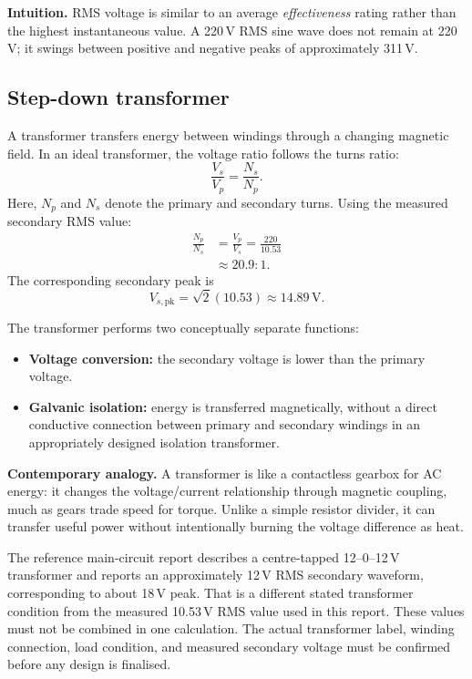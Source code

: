 \documentclass[journal,12pt,twocolumn]{IEEEtran}
\begin{document}
\textbf{Intuition.} RMS voltage is similar to an average
\emph{effectiveness} rating rather than the highest instantaneous
value. A 220\,V RMS sine wave does not remain at 220\,V; it swings
between positive and negative peaks of approximately 311\,V.

\subsection*{Step-down transformer}
A transformer transfers energy between windings through a changing
magnetic field. In an ideal transformer, the voltage ratio follows
the turns ratio:
\begin{equation}
    \boxed{\frac{V_s}{V_p}=\frac{N_s}{N_p}.}
    \label{eq:transformer-ratio}
\end{equation}
Here, $N_p$ and $N_s$ denote the primary and secondary turns. Using
the measured secondary RMS value:
\begin{align}
    \frac{N_p}{N_s}
    &=\frac{V_p}{V_s}
      =\frac{220}{10.53}\\
    &\approx 20.9:1.
\end{align}
The corresponding secondary peak is
\begin{equation}
    V_{s,\mathrm{pk}}=\sqrt{2}(10.53)
    \approx 14.89\,\mathrm{V}.
    \label{eq:secondary-peak}
\end{equation}

The transformer performs two conceptually separate functions:
\begin{itemize}[leftmargin=1.5em]
    \item \textbf{Voltage conversion:} the secondary voltage is lower
    than the primary voltage.
    \item \textbf{Galvanic isolation:} energy is transferred
    magnetically, without a direct conductive connection between
    primary and secondary windings in an appropriately designed
    isolation transformer.
\end{itemize}

\textbf{Contemporary analogy.} A transformer is like a contactless
gearbox for AC energy: it changes the voltage/current relationship
through magnetic coupling, much as gears trade speed for torque.
Unlike a simple resistor divider, it can transfer useful power
without intentionally burning the voltage difference as heat.

The reference main-circuit report describes a centre-tapped
12--0--12\,V transformer and reports an approximately 12\,V RMS
secondary waveform, corresponding to about 18\,V peak. That is a
different stated transformer condition from the measured
10.53\,V RMS value used in this report. These values must not be
combined in one calculation. The actual transformer label, winding
connection, load condition, and measured secondary voltage must be
confirmed before any design is finalised.
\end{document}
